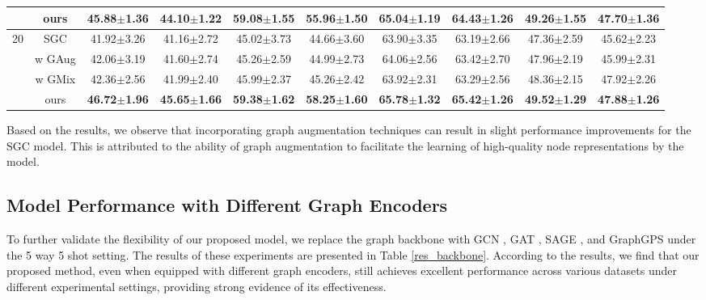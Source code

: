 \begin{table*}[ht]
{\begin{tabular}{@{}c|c|cccccccc@{}}
                      & ours                   & \textbf{45.88$\pm$1.36}          & \textbf{44.10$\pm$1.22}         & \textbf{59.08$\pm$1.55}          & \textbf{55.96$\pm$1.50}         & \textbf{65.04$\pm$1.19}         & \textbf{64.43$\pm$1.26}         & \textbf{49.26$\pm$1.55}         & \textbf{47.70$\pm$1.36}         \\ \midrule
\multirow{4}{*}{20}   & SGC                    & 41.92$\pm$3.26                   & 41.16$\pm$2.72                  & 45.02$\pm$3.73                   & 44.66$\pm$3.60                  & 63.90$\pm$3.35                  & 63.19$\pm$2.66                  & 47.36$\pm$2.59                  & 45.62$\pm$2.23                  \\
                      & w GAug                 & 42.06$\pm$3.19                   & 41.60$\pm$2.74                  & 45.26$\pm$2.59                   & 44.99$\pm$2.73                  & 64.06$\pm$2.56                  & 63.42$\pm$2.70                  & 47.96$\pm$2.19                  & 45.99$\pm$2.31                  \\
                      & w GMix                 & 42.36$\pm$2.56                   & 41.99$\pm$2.40                  & 45.99$\pm$2.37                   & 45.26$\pm$2.42                  & 63.92$\pm$2.31                  & 63.29$\pm$2.56                  & 48.36$\pm$2.15                  & 47.92$\pm$2.26                  \\
                      & ours                   & \textbf{46.72$\pm$1.96}          & \textbf{45.65$\pm$1.66}         & \textbf{59.38$\pm$1.62}          & \textbf{58.25$\pm$1.60}         & \textbf{65.78$\pm$1.32}         & \textbf{65.42$\pm$1.26}         & \textbf{49.52$\pm$1.29}         & \textbf{47.88$\pm$1.26}         \\ \bottomrule
\end{tabular}%
}
\end{table*}
Based on the results, we observe that incorporating graph augmentation techniques can result in slight performance improvements for the SGC model. This is attributed to the ability of graph augmentation to facilitate the learning of high-quality node representations by the model.

\subsection{Model Performance with Different Graph Encoders}
To further validate the flexibility of our proposed model, we replace the graph backbone with GCN \cite{kipf2016semi}, GAT \cite{velivckovic2017graph}, SAGE \cite{hamilton2017inductive}, and GraphGPS \cite{rampavsek2022recipe} under the 5 way 5 shot setting. The results of these experiments are presented in Table \ref{res_backbone}. According to the results, we find that our proposed method, even when equipped with different graph encoders, still achieves excellent performance across various datasets under different experimental settings, providing strong evidence of its effectiveness.


